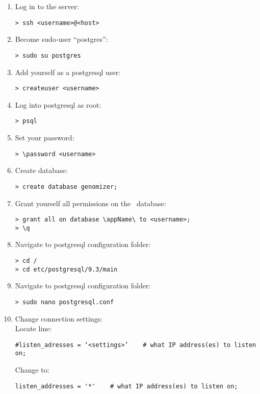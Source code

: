     \begin{enumerate}
      \item Log in to the server:
      \begin{verbatim}
> ssh <username>@<host>
      \end{verbatim}

      \item Become sudo-user “postgres”:
      \begin{verbatim}
> sudo su postgres
      \end{verbatim}

      \item Add yourself as a postgresql user:
      \begin{verbatim}
> createuser <username>
      \end{verbatim}

      \item Log into postgresql as root:
      \begin{verbatim}
> psql
      \end{verbatim}

      \item Set your password:
      \begin{verbatim}
> \password <username>
      \end{verbatim}

      \item Create database:
      \begin{verbatim}
> create database genomizer;
      \end{verbatim}

      \item Grant yourself all permissions on the \appName\ database: \begin{verbatim}
> grant all on database \appName\ to <username>;
> \q
      \end{verbatim}

      \item Navigate to postgresql configuration folder:
      \begin{verbatim}
> cd /
> cd etc/postgresql/9.3/main
      \end{verbatim}

      \item Navigate to postgresql configuration folder:
      \begin{verbatim}
> sudo nano postgresql.conf
      \end{verbatim}

      \item Change connection settings:\\Locate line: 
      \begin{verbatim}
#listen_adresses = ‘<settings>’    # what IP address(es) to listen on;
      \end{verbatim}
      Change to:
      \begin{verbatim}
listen_addresses = '*'    # what IP address(es) to listen on;
      \end{verbatim}


\end{enumerate}
